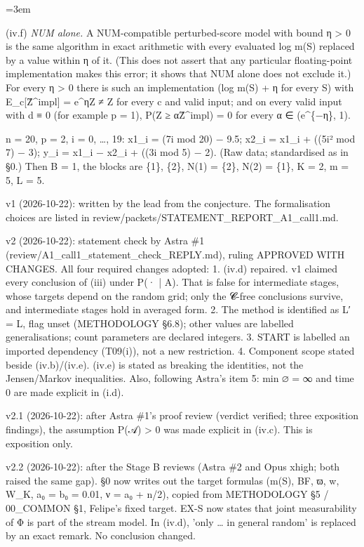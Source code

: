 \documentclass[11pt]{report}
\newenvironment{mdblock}{\begingroup\mdfont\raggedright\setlength{\parindent}{0pt}\setlength{\parskip}{0.55em}\emergencystretch=3em}{\par\endgroup}
\newcommand{\mdhead}[2]{\par\vspace{0.7em}\noindent{\bfseries\ifcase#1\or\large\or\normalsize\or\normalsize\or\small\or\small\or\small\fi #2}\par\nopagebreak\vspace{0.1em}}
\begin{document}
\begin{mdblock}
\begin{mdbul}
\item (iv.f) \emph{NUM alone.} A NUM-compatible perturbed-score model with bound η > 0 is the same algorithm in exact arithmetic with every evaluated log m(S) replaced by a value within η of it. (This does not assert that any particular floating-point implementation makes this error; it shows that NUM alone does not exclude it.) For every η > 0 there is such an implementation (log m(S) + η for every S) with E\_c[Ẑ\textasciicircum{}impl] = e\textasciicircum{}ηZ ≠ Z for every c and valid input; and on every valid input with d ≡ 0 (for example p = 1), P(Z ≥ αẐ\textasciicircum{}impl) = 0 for every α ∈ (e\textasciicircum{}\{−η\}, 1).
\end{mdbul}

\mdhead{2}{Appendix: data for (iv.b) and (iv.e)}

n = 20, p = 2, i = 0, …, 19: x1\_i = (7i mod 20) − 9.5; x2\_i = x1\_i + ((5i² mod 7) − 3); y\_i = x1\_i − x2\_i + ((3i mod 5) − 2). (Raw data; standardised as in §0.) Then B = 1, the blocks are \{1\}, \{2\}, N(1) = \{2\}, N(2) = \{1\}, K = 2, m = 5, L = 5.

\mdhead{2}{Statement history}

\begin{mdbul}
\item v1 (2026-10-22): written by the lead from the conjecture. The formalisation choices are listed in review/packets/STATEMENT\_REPORT\_A1\_call1.md.
\item v2 (2026-10-22): statement check by Astra \#1 (review/A1\_call1\_statement\_check\_REPLY.md), ruling APPROVED WITH CHANGES. All four required changes adopted: 1. (iv.d) repaired. v1 claimed every conclusion of (iii) under P(· | A). That is false for intermediate stages, whose targets depend on the random grid; only the 𝓒-free conclusions survive, and intermediate stages hold in averaged form. 2. The method is identified as L′ = L, flag unset (METHODOLOGY §6.8); other values are labelled generalisations; count parameters are declared integers. 3. START is labelled an imported dependency (T09(i)), not a new restriction. 4. Component scope stated beside (iv.b)/(iv.e). (iv.e) is stated as breaking the identities, not the Jensen/Markov inequalities. Also, following Astra's item 5: min ∅ = ∞ and time 0 are made explicit in (i.d).
\item v2.1 (2026-10-22): after Astra \#1's proof review (verdict verified; three exposition findings), the assumption P(𝒜) > 0 was made explicit in (iv.c). This is exposition only.
\item v2.2 (2026-10-22): after the Stage B reviews (Astra \#2 and Opus xhigh; both raised the same gap). §0 now writes out the target formulas (m(S), BF, ϖ, w, W\_K, a₀ = b₀ = 0.01, ν = a₀ + n/2), copied from METHODOLOGY §5 / 00\_COMMON §1, Felipe's fixed target. EX-S now states that joint measurability of Φ is part of the stream model. In (iv.d), 'only … in general random' is replaced by an exact remark. No conclusion changed.
\end{mdbul}
\end{mdblock}
\end{document}
